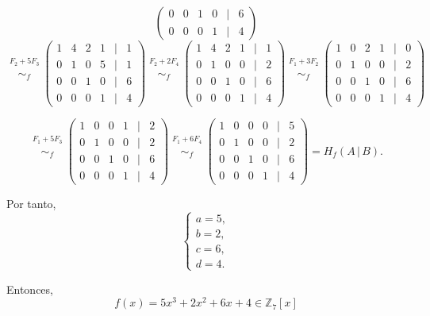 \documentclass[a4paper,12pt]{article}
\begin{document}
\begin{ejercicio}[title=Ejercicio 39]
\[\begin{pmatrix}
0 & 0 & 1 & 0 &\Big|& 6\\
0 & 0 & 0 & 1 &\Big|& 4
\end{pmatrix}
\]
\vspace{0.4em}
\[
\overset{\substack{F_2+5F_3\\{}}}{\sim_f}
\begin{pmatrix}
1 & 4 & 2 & 1 &\Big|& 1\\
0 & 1 & 0 & 5 &\Big|& 1\\
0 & 0 & 1 & 0 &\Big|& 6\\
0 & 0 & 0 & 1 &\Big|& 4
\end{pmatrix}
\overset{\substack{F_2+2F_4\\{}}}{\sim_f}
\begin{pmatrix}
1 & 4 & 2 & 1 &\Big|& 1\\
0 & 1 & 0 & 0 &\Big|& 2\\
0 & 0 & 1 & 0 &\Big|& 6\\
0 & 0 & 0 & 1 &\Big|& 4
\end{pmatrix}
\overset{\substack{F_1+3F_2\\{}}}{\sim_f}
\begin{pmatrix}
1 & 0 & 2 & 1 &\Big|& 0\\
0 & 1 & 0 & 0 &\Big|& 2\\
0 & 0 & 1 & 0 &\Big|& 6\\
0 & 0 & 0 & 1 &\Big|& 4
\end{pmatrix}
\]
\end{ejercicio}
\begin{ejercicio}[title=Ejercicio 39]
\[
\overset{\substack{F_1+5F_3\\{}}}{\sim_f}
\begin{pmatrix}
1 & 0 & 0 & 1 &\Big|& 2\\
0 & 1 & 0 & 0 &\Big|& 2\\
0 & 0 & 1 & 0 &\Big|& 6\\
0 & 0 & 0 & 1 &\Big|& 4
\end{pmatrix}
\overset{\substack{F_1+6F_4\\{}}}{\sim_f}
\begin{pmatrix}
1 & 0 & 0 & 0 &\Big|& 5\\
0 & 1 & 0 & 0 &\Big|& 2\\
0 & 0 & 1 & 0 &\Big|& 6\\
0 & 0 & 0 & 1 &\Big|& 4
\end{pmatrix}
= H_f(A\,|\,B).
\]

Por tanto,
\[
\begin{cases}
a = 5,\\
b = 2,\\
c = 6,\\
d = 4.
\end{cases}
\]

Entonces,
\[
\boxed{f(x)=5x^3+2x^2+6x+4 \in \mathbb{Z}_7[x]}
\]

\end{ejercicio}
\end{document}
